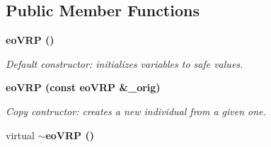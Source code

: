\subsection*{Public Member Functions}
\begin{CompactItemize}
\item 
\bf{eo\-VRP} ()\label{classeo_v_r_p_20e79a2ad5721ce7f2fe4a88f00692de}

\begin{CompactList}\small\item\em Default constructor: initializes variables to safe values. \item\end{CompactList}\item 
\bf{eo\-VRP} (const \bf{eo\-VRP} \&\_\-orig)
\begin{CompactList}\small\item\em Copy contructor: creates a new individual from a given one. \item\end{CompactList}\item 
virtual \bf{$\sim$eo\-VRP} ()\label{classeo_v_r_p_dedbd3437656d5dacafab6652219c8e2}


\end{CompactItemize}
